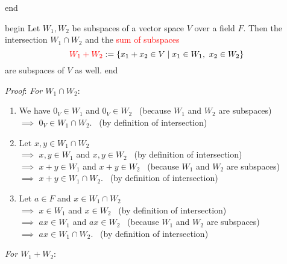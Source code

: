 \documentclass[
  12pt,
  a4paper,
  twoside]{article}
\providecommand{\tightlist}{%
  \setlength{\itemsep}{0pt}\setlength{\parskip}{0pt}}
\theoremstyle{plain}
\theoremstyle{definition}
\begin{document}
\csname end

\csname begin\label{cnj:prop-sum-int-subspaces}
Let \(W_{1},W_{2}\) be subspaces of a vector space \(V\) over a field \(F\).
Then the intersection \(W_{1} \cap W_{2}\) and the \textcolor{red}{sum of subspaces}
\[ {\color{red}{W_{1} + W_{2}}} := \{ x_{1} + x_{2}\in V \mid x_{1} \in W_{1}, \ x_{2} \in W_{2} \} \]
are subspaces of \(V\) as well.
\csname end

\emph{Proof}: \emph{For \(W_{1} \cap W_{2}\)}:

\begin{enumerate}
\def\labelenumi{(\alph{enumi})}
\tightlist
\item
  We have \(0_V\in W_1\) and \(0_V\in W_2\) \hfill~{(because \(W_1\) and \(W_2\) are subspaces)}\\
  \(\implies\) \(0_V\in W_1\cap W_2\). \hfill~{(by definition of intersection)}
\item
  Let \(x,y\in W_1\cap W_2\)\\
  \(\implies\) \(x,y \in W_1\) and \(x,y\in W_2\) \hfill~{(by definition of intersection)}\\
  \(\implies\) \(x+y\in W_1\) and \(x+y\in W_2\) \hfill~{(because \(W_1\) and \(W_2\) are subspaces)}\\
  \(\implies\) \(x+y\in W_1\cap W_2\). \hfill~{(by definition of intersection)}
\item
  Let \(a\in F\) and \(x\in W_1\cap W_2\)\\
  \(\implies\) \(x \in W_1\) and \(x\in W_2\) \hfill~{(by definition of intersection)}\\
  \(\implies\) \(ax\in W_1\) and \(ax\in W_2\) \hfill~{(because \(W_1\) and \(W_2\) are subspaces)}\\
  \(\implies\) \(ax\in W_1\cap W_2\). \hfill~{(by definition of intersection)}
\end{enumerate}

\emph{For \(W_{1} + W_{2}\)}:
\end{document}
